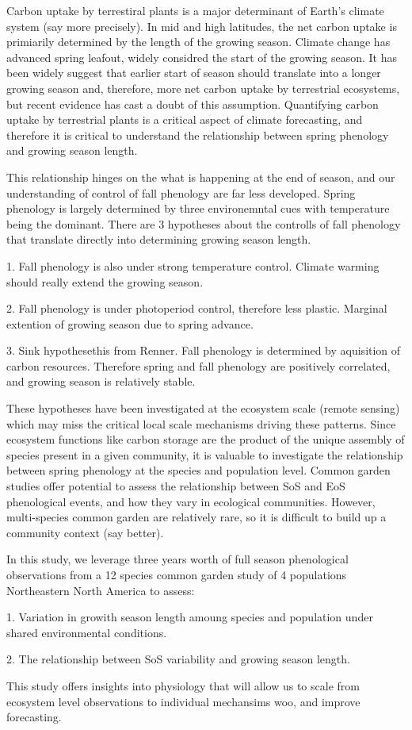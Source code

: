 Carbon uptake by terrestiral plants is a major determinant of Earth's climate system (say more precisely). In mid and high latitudes, the net carbon uptake is primiarily determined by the length of the growing season. Climate change has advanced spring leafout, widely considred the start of the growing season. It has been widely suggest that earlier start of season should translate into a longer growing season and, therefore, more net carbon uptake by terrestrial ecosystems, but recent evidence has cast a doubt of this assumption. Quantifying carbon uptake by terrestrial plants is a critical aspect of climate forecasting, and therefore it is critical to understand the relationship between spring phenology and growing season length.

This relationship hinges on the what is happening at the end of season, and our understanding of control of fall phenology are far less developed. Spring phenology is largely determined by three environemntal cues with temperature being the dominant. There are 3 hypotheses about the controlls of fall phenology that translate directly into determining growing season length.

1. Fall phenology is also under strong temperature control. Climate warming should really extend the growing season.

2. Fall phenology is under photoperiod control, therefore less plastic. Marginal extention of growing season due to spring advance.

3. Sink hypothesethis from Renner. Fall phenology is determined by aquisition of carbon resources. Therefore spring and fall phenology are positively correlated, and growing season is relatively stable.


These hypotheses have been investigated at the ecosystem scale (remote sensing) which may miss the critical local scale mechanisms driving these patterns. Since ecosystem functions like carbon storage are the product of the unique assembly of species present in a given community, it is valuable to investigate the relationship between spring phenology at the species and population level. Common garden studies offer potential to assess the relationship between SoS and EoS phenological events, and how they vary in ecological communities. However, multi-species common garden are relatively rare, so it is difficult to build up a community context (say better).

In this study, we leverage three years worth of full season phenological observations from a 12 species common garden study of 4 populations Northeastern North America to assess:

1. Variation in growith season length amoung species and population under shared environmental conditions.

2. The relationship between SoS variability and growing season length.

This study offers insights into physiology that will allow us to scale from ecosystem level observations to individual mechansims woo, and improve forecasting.